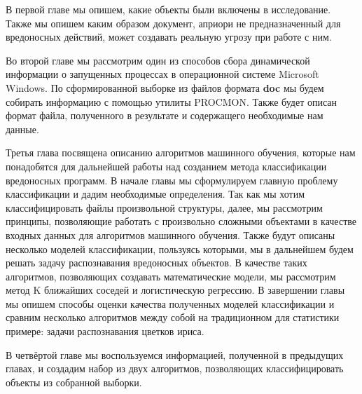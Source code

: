 В первой главе мы опишем, какие объекты были включены в исследование.
Также мы опишем каким образом документ, априори не предназначенный для вредоносных действий, может создавать реальную угрозу при работе с ним.

Во второй главе мы рассмотрим один из способов сбора динамической информации о запущенных процессах в операционной системе Microsoft Windows. 
По сформированной выборке из файлов формата \textbf{doc} мы будем собирать информацию с помощью утилиты PROCMON.
Также будет описан формат файла, полученного в результате и содержащего необходимые нам данные.

Третья глава посвящена описанию алгоритмов машинного обучения, которые нам понадобятся для дальнейшей работы над созданием метода классификации вредоносных программ.
В начале главы мы сформулируем главную проблему классификации и дадим необходимые определения.
Так как мы хотим классифицировать файлы произвольной структуры, далее, мы рассмотрим принципы, позволяющие работать с произвольно сложными объектами в качестве входных данных для алгоритмов машинного обучения.
Также будут описаны несколько моделей классификации, пользуясь которыми, мы в дальнейшем будем решать задачу распознавания вредоносных объектов.
В качестве таких алгоритмов, позволяющих создавать математические модели, мы рассмотрим метод K ближайших соседей и логистическую регрессию.
В завершении главы мы опишем способы оценки качества полученных моделей классификации и сравним несколько алгоритмов между собой на традиционном для статистики примере: задачи распознавания цветков ириса.

В четвёртой главе мы воспользуемся информацией, полученной в предыдущих главах, и создадим набор из двух алгоритмов, позволяющих классифицировать объекты из собранной выборки.

